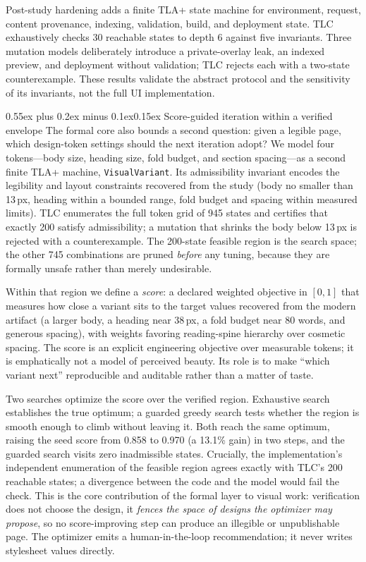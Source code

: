 \documentclass[9pt,twocolumn]{extarticle}
\makeatletter
\renewcommand{\subsection}{\@startsection{subsection}{2}{0pt}%
  {0.55ex plus 0.2ex minus 0.1ex}{0.15ex}%
  {\normalfont\normalsize\bfseries}}
\makeatother
\begin{document}
Post-study hardening adds a finite TLA+ state machine for environment, request, content provenance, indexing, validation, build, and deployment state. TLC exhaustively checks 30 reachable states to depth 6 against five invariants. Three mutation models deliberately introduce a private-overlay leak, an indexed preview, and deployment without validation; TLC rejects each with a two-state counterexample. These results validate the abstract protocol and the sensitivity of its invariants, not the full UI implementation.

\subsection{Score-guided iteration within a verified envelope}
The formal core also bounds a second question: given a legible page, which design-token settings should the next iteration adopt? We model four tokens---body size, heading size, fold budget, and section spacing---as a second finite TLA+ machine, \texttt{VisualVariant}. Its admissibility invariant encodes the legibility and layout constraints recovered from the study (body no smaller than 13\,px, heading within a bounded range, fold budget and spacing within measured limits). TLC enumerates the full token grid of 945 states and certifies that exactly 200 satisfy admissibility; a mutation that shrinks the body below 13\,px is rejected with a counterexample. The 200-state feasible region is the search space; the other 745 combinations are pruned \emph{before} any tuning, because they are formally unsafe rather than merely undesirable.

Within that region we define a \emph{score}: a declared weighted objective in $[0,1]$ that measures how close a variant sits to the target values recovered from the modern artifact (a larger body, a heading near 38\,px, a fold budget near 80 words, and generous spacing), with weights favoring reading-spine hierarchy over cosmetic spacing. The score is an explicit engineering objective over measurable tokens; it is emphatically not a model of perceived beauty. Its role is to make ``which variant next'' reproducible and auditable rather than a matter of taste.

Two searches optimize the score over the verified region. Exhaustive search establishes the true optimum; a guarded greedy search tests whether the region is smooth enough to climb without leaving it. Both reach the same optimum, raising the seed score from 0.858 to 0.970 (a 13.1\% gain) in two steps, and the guarded search visits zero inadmissible states. Crucially, the implementation's independent enumeration of the feasible region agrees exactly with TLC's 200 reachable states; a divergence between the code and the model would fail the check. This is the core contribution of the formal layer to visual work: verification does not choose the design, it \emph{fences the space of designs the optimizer may propose}, so no score-improving step can produce an illegible or unpublishable page. The optimizer emits a human-in-the-loop recommendation; it never writes stylesheet values directly.
\end{document}

